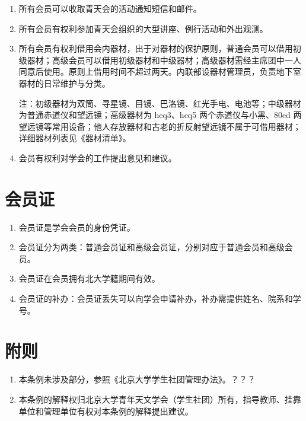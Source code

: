 \begin{enumerate}[resume]
    \item 所有会员可以收取青天会的活动通知短信和邮件。
    
    \item 所有会员有权利参加青天会组织的大型讲座、例行活动和外出观测。
    
    \item 所有会员有权利借用会内器材，出于对器材的保护原则，普通会员可以借用初级器材；高级会员可以借用初级器材和中级器材；高级器材需经主席团中一人同意后使用。原则上借用时间不超过两天。内联部设器材管理员，负责地下室器材的日常维护与分类。
    
    注：初级器材为双筒、寻星镜、目镜、巴洛镜、红光手电、电池等；中级器材为普通赤道仪和望远镜；高级器材为 heq3、heq5 两个赤道仪与小黑、80ed 两望远镜等常用设备；他人存放器材和古老的折反射望远镜不属于可借用器材；详细器材列表见《器材清单》。
    
    \item 会员有权利对学会的工作提出意见和建议。
\end{enumerate}

\section{会员证}

\begin{enumerate}[resume]
    \item 会员证是学会会员的身份凭证。
    
    \item 会员证分为两类：普通会员证和高级会员证，分别对应于普通会员和高级会员。
    
    \item 会员证在会员拥有北大学籍期间有效。
    
    \item 会员证的补办：会员证丢失可以向学会申请补办，补办需提供姓名、院系和学号。
\end{enumerate}

\section{附则}

\begin{enumerate}[resume]        
    \item 本条例未涉及部分，参照《北京大学学生社团管理办法》。？？？

    \item 本条例的解释权归北京大学青年天文学会（学生社团）所有，指导教师、挂靠单位和管理单位有权对本条例的解释提出建议。
\end{enumerate}
